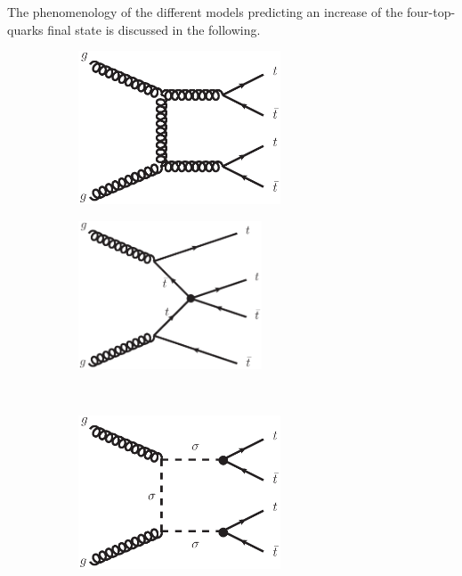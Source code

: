 The phenomenology of the different models predicting an increase of the four-top-quarks final state is discussed in the following.

\begin{figure}[tbp]
\centering
\begin{subfigure}{0.49\textwidth} 
\centering
  \includegraphics[width=0.66\textwidth]{Theory/FeynmanGraphs/4tops_SM.eps}
  \caption{}\label{fig:fourtop_SM} \end{subfigure}
\begin{subfigure}{0.49\textwidth} 
\centering
  \includegraphics[width=0.60\textwidth]{Theory/FeynmanGraphs/4tops_CI.eps}
  \caption{}\label{fig:fourtop_CI} \end{subfigure}
\\
\begin{subfigure}{0.49\textwidth} 
\centering
  \includegraphics[width=0.66\textwidth]{Theory/FeynmanGraphs/4tops_sgluon.eps}

\end{subfigure}
\end{figure}

